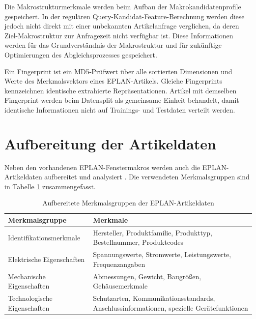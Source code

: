 Die Makrostrukturmerkmale werden beim Aufbau der Makrokandidatenprofile gespeichert. In der regulären Query-Kandidat-Feature-Berechnung werden diese jedoch nicht direkt mit einer unbekannten Artikelanfrage verglichen, da deren Ziel-Makrostruktur zur Anfragezeit nicht verfügbar ist.
Diese Informationen werden für das Grundverständnis der Makrostruktur und für zukünftige Optimierungen des Abgleichsprozesses gespeichert.

Ein Fingerprint ist ein MD5-Prüfwert über alle sortierten Dimensionen und Werte des Merkmalsvektors eines EPLAN-Artikels. Gleiche Fingerprints kennzeichnen identische extrahierte Repräsentationen. Artikel mit demselben Fingerprint werden beim Datensplit als gemeinsame Einheit behandelt, damit identische Informationen nicht auf Trainings- und Testdaten verteilt werden.


\section{Aufbereitung der Artikeldaten}

Neben den vorhandenen EPLAN-Fenstermakros \parencite{EPLAN-Makros} werden auch die EPLAN-Artikeldaten \parencite{EPLANArtikelverwaltung} aufbereitet und analysiert \parencite{srcStep911}.
Die verwendeten Merkmalsgruppen sind in Tabelle \ref{tab:artikelmerkmale} zusammengefasst.

\begin{table}[H]
    \centering
    \setlength{\tabcolsep}{4pt}
    \renewcommand{\arraystretch}{1.08}
    \caption{Aufbereitete Merkmalsgruppen der EPLAN-Artikeldaten}
    \label{tab:artikelmerkmale}
    \begin{tabularx}{\textwidth}{>{\raggedright\arraybackslash}p{4.8cm} >{\raggedright\arraybackslash}X}
        \toprule
        \textbf{Merkmalsgruppe} & \textbf{Merkmale} \\
        \midrule
        Identifikationsmerkmale & Hersteller, Produktfamilie, Produkttyp, Bestellnummer, Produktcodes \\
        Elektrische Eigenschaften & Spannungswerte, Stromwerte, Leistungswerte, Frequenzangaben \\
        Mechanische Eigenschaften & Abmessungen, Gewicht, Baugrößen, Gehäusemerkmale \\
        Technologische Eigenschaften & Schutzarten, Kommunikationsstandards, Anschlussinformationen, spezielle Gerätefunktionen \\
        \bottomrule
    \end{tabularx}
\end{table}

